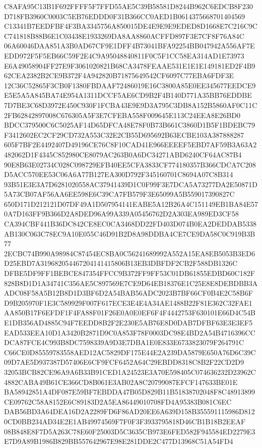 \documentclass[UTF8,fontset=fandol,zihao=-4,a4paper]{ctexart}
\begin{document}
{{C8AFA95C13B1F692FFFF5F7FFD55AE5C39B58581D8244B962C6EDCB8F230D718FB3960C0003C5EB76EDDD0F31B366CC0AED1B0614375668701404569
C13341B7EEDFBF4F3BA3345756A850015DE4E9E9E9EDED8D1668E7C216C9CC741818B88B6E1C03438E1933269DA8AA8860ACFFD897F3E7CF8F76A84C
06A60046DAA851A3B0AD67CF9E1DFF4B73041BFA92254BB047942A556AF7EEDD972F5F5EB66C59F2E4C9A95048840811F0C5F1CC58EA314AD1E73973
E6A49058904FF27E9F3061020821B68CA3478FEAAE531E1E1E149181ED2F4B962CEA2382B2CE9B372F4A942820B71875649542CF6097C77EBA6FDF3E
12C36C52865F3CB0F1380FBDAAF72486019E16C3800A85E0EE345677EEDCE9E5E5A5A845BA74E954A1311DCCF5AE6CD9B2F4B140D771A35BB76EDDBE
7D7BE3C68D3972E450C930F1FCBA43E9E9D3A795C3DB8A152B5860AF0C11C2FB62842897008C676305A5F3E7CFEBA558F009645E113C24EEA8E26BD0
BDCC379500C6C5025AF14D65DFCA48E78F0B73B661C3860D1B5F1BDEBC79F3412602EC2CF29CD732A553C32E2CB55D695692B63ECBE103A387888287
605F7BF2E4492407D49196CE76C8F10CAD41E966EEEEF5EBD7AF59B3A63A2482062D1F4345C852980CE8079AC263B0A6DC34271ABD6240CF64AC87B4
90E8B63E02734C028C098729EFB40EE5CFA3833CF774180357B366CDCA7C208D5ACC570EE53C06A6A77B127EA300D792F345160701C8694A07C8B314
93B51E3E3A7D6281020558AC37941439D1C0F99F3E7DCA5A73277DA2E50871D5A73CB07AF56AA6EE598E6C39CA7FB579F3E65099A5B559017390827C
650D171D212121D07DF49A1D507954141EABE5A12B26A4C151149EB1BA84E570A7D163FF9B366D2A8DED96A99A339A05456762D2A303EA989ED3CF58
CA394CBF441B36DC842CE8EC0CA3468DD22FD403D074B0EA2DEDDAB5338AB130C063C78EC9A10E055C46D91B2D8A98DDBA4CE7CE9DA58C0C919B3B77
2ECBC74B990A98984C87454EC8BA0C56241689992A552A15EA8EB5053B3ED6D25EBD7A319682054467204141415806B13EB3DBFDF2CB2F588DB1326C
DFBE5DF9FF1BEBCE847354FFCC9B372FF9FF53C01DB61855EDBD60C182F828B8D1D1A34741C356AE5C897569E7CE9D64EB18376E1C25E8E8DEBDBB3A
ADC08F58A5B12B8D1D3BF6D2A54BAB56ADC2023B7BF66CF0B4E2C58B6FD9B205970F1E3C589929F007F617ECE3E4E4A34AE1488B22F81E362C32FAE1
AA850B17F6EFDF1F4FA88F01F26E0A0E0EF6F4F4442753F630101E66D4C54BE1DB356AD4885C94F7EEDD8B2F2E230E5AB76E8D0DAB7DFBF63E3E3EF5
EAD533EEA10D1A3420B2871D9C0A853F78F0003DC98E4BD2A54B4716396CCDCA87FCE4C993B8DC7598339A9D3E7DBA1E0E833E6733823079F264791C
C66CE0D85559783558AED12AC5829DF175E44E2A239DA5879E650A76D6C39C09D7AE5D937387D57406E6CF9FCF6452A64C29EBDD8318C8B2F22CD2D9
32053BCB82CE96A9A6B33B91CED1A24523E3A70E598405C074636232D23962C4882CABA49B61CE366CD8B061E3AB02A8C20799087EFCF147633BE01E
BA58942851A4DF087E59BF7EBDDA47B05D829B11B51838702048F8C48913899CE09762C58A8152E6C89183D2A5EA86449010708FD4A95383B081C6EC
DAB56BD3A64DEA16D2A2289FD6F86AD20EE6A639D158B355591115986D8120CD0BB234AD34E2E1AB49974569F7F0F3F3933795818D46CB1B18B2EEAF
08B848E8F7D5A263C78E60F25003D5C3635CB973E6FED582F945584ED2279E3E7D9A89B1986B829BB557642967E98E281DDE2C477D13968C51A54FD4
}}
\end{document}
